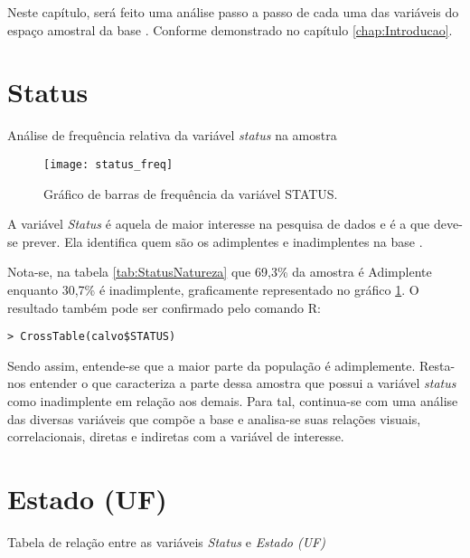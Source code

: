 Neste capítulo, será feito uma análise passo a passo de cada uma das
variáveis do espaço amostral da base \nomeDaBase{}. Conforme demonstrado
no capítulo \ref{chap:Introducao}.


\section{Status}

\begin{table}[h]
\centering

\caption{\label{tab:StatusEstado}Análise de frequência relativa da variável \emph{status} na amostra}
\end{table}

\begin{figure}
\begin{centering}
\texttt{[image: status\_freq]}
\par\end{centering}

\caption{\label{fig:FreqStatus}Gráfico de barras de frequência da variável
STATUS.}
\end{figure}
A variável \emph{Status }é aquela de maior interesse na pesquisa de
dados e é a que deve-se prever. Ela identifica quem são os adimplentes
e inadimplentes na base \nomeDaBase{}.

Nota-se, na tabela \ref{tab:StatusNatureza} que 69,3\% da amostra
é Adimplente enquanto 30,7\% é inadimplente, graficamente representado
no gráfico \ref{fig:FreqStatus}. O resultado também pode ser confirmado
pelo comando R:

\begin{verbatim}
> CrossTable(calvo$STATUS)
\end{verbatim}

Sendo assim, entende-se que a maior parte da população é adimplemente. Resta-nos entender o que caracteriza
a parte dessa amostra que possui a variável \emph{status} como inadimplente em relação aos demais. Para tal, continua-se
com uma análise das diversas variáveis que compõe a base e analisa-se suas relações visuais, correlacionais, diretas e indiretas
com a variável de interesse.

\section{Estado (UF)}

\begin{table}[h]
\centering

\caption{\label{tab:StatusEstado}Tabela de relação entre as variáveis \emph{Status} e \emph{Estado (UF)}}
\end{table}

